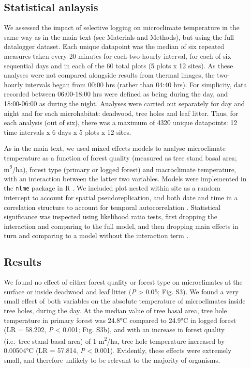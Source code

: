 \documentclass[12pt,a4paper,]{report}
\theoremstyle{definition}
\theoremstyle{definition}
\theoremstyle{definition}
\theoremstyle{remark}
\begin{document}
\subsection{Statistical anlaysis}\label{statistical-anlaysis}

We assessed the impact of selective logging on microclimate temperature
in the same way as in the main text (see Materials and Methods), but
using the full datalogger dataset. Each unique datapoint was the median
of six repeated measures taken every 20 minutes for each two-hourly
interval, for each of six sequential days and in each of the 60 total
plots (5 plots x 12 sites). As these analyses were not compared
alongside results from thermal images, the two-hourly intervals began
from 00:00 hrs (rather than 04:40 hrs). For simplicity, data recorded
between 06:00-18:00 hrs were defined as being during the day, and
18:00-06:00 as during the night. Analyses were carried out separately
for day and night and for each microhabitat: deadwood, tree holes and
leaf litter. Thus, for each analysis (out of six), there was a maximum
of 4320 unique datapoints: 12 time intervals x 6 days x 5 plots x 12
sites.

As in the main text, we used mixed effects models to analyse
microclimate temperature as a function of forest quality (measured as
tree stand basal area; m\textsuperscript{2}/ha), forest type (primary or
logged forest) and macroclimate temperature, with an interaction between
the latter two variables. Models were implemented in the \texttt{nlme}
package \citep{pinheiro_nlme:_2017} in R \citep{r_core_team_2017}. We
included plot nested within site as a random intercept to account for
spatial pseudoreplication, and both date and time in a correlation
structure to account for temporal autocorrelation \citep[the best
structure was determined using AIC;][]{zuur_mixed_2009}. Statistical
significance was inspected using likelihood ratio tests, first dropping
the interaction and comparing to the full model, and then dropping main
effects in turn and comparing to a model without the interaction term
\citep{zuur_mixed_2009}.

\subsection{Results}\label{results-6}

We found no effect of either forest quality or forest type on
microclimates at the surface or inside deadwood and leaf litter
(\emph{P} \textgreater{} 0.05; Fig. S3). We found a very small effect of
both variables on the absolute temperature of microclimates inside tree
holes, during the day. At the median value of tree basal area, tree hole
temperature in primary forest was 24.8°C compared to 24.9°C in logged
forest (LR = 58.202, \emph{P} \textless{} 0.001; Fig. S3b), and with an
increase in forest quality (i.e.~tree stand basal area) of 1
m\textsuperscript{2}/ha, tree hole temperature increased by 0.00504°C
(LR = 57.814, \emph{P} \textless{} 0.001). Evidently, these effects were
extremely small, and therefore unlikely to be relevant to the majority
of organisms.
\end{document}
